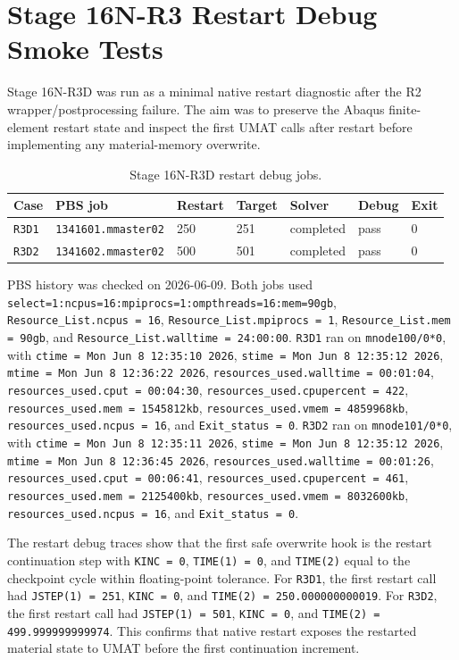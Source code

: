 \documentclass[11pt,a4paper]{article}
\newcommand{\code}[1]{\texttt{#1}}
\begin{document}
\section{Stage 16N-R3 Restart Debug Smoke Tests}

Stage 16N-R3D was run as a minimal native restart diagnostic after the R2 wrapper/postprocessing failure. The aim was to preserve the Abaqus finite-element restart state and inspect the first UMAT calls after restart before implementing any material-memory overwrite.

\begin{table}[H]
\centering
\caption{Stage 16N-R3D restart debug jobs.}
\begin{tabular}{lllllll}
\toprule
Case & PBS job & Restart & Target & Solver & Debug & Exit \\
\midrule
\code{R3D1} & \code{1341601.mmaster02} & 250 & 251 & completed & pass & 0 \\
\code{R3D2} & \code{1341602.mmaster02} & 500 & 501 & completed & pass & 0 \\
\bottomrule
\end{tabular}
\end{table}

PBS history was checked on 2026-06-09. Both jobs used \code{select=1:ncpus=16:mpiprocs=1:ompthreads=16:mem=90gb}, \code{Resource\_List.ncpus = 16}, \code{Resource\_List.mpiprocs = 1}, \code{Resource\_List.mem = 90gb}, and \code{Resource\_List.walltime = 24:00:00}. \code{R3D1} ran on \code{mnode100/0*0}, with \code{ctime = Mon Jun 8 12:35:10 2026}, \code{stime = Mon Jun 8 12:35:12 2026}, \code{mtime = Mon Jun 8 12:36:22 2026}, \code{resources\_used.walltime = 00:01:04}, \code{resources\_used.cput = 00:04:30}, \code{resources\_used.cpupercent = 422}, \code{resources\_used.mem = 1545812kb}, \code{resources\_used.vmem = 4859968kb}, \code{resources\_used.ncpus = 16}, and \code{Exit\_status = 0}. \code{R3D2} ran on \code{mnode101/0*0}, with \code{ctime = Mon Jun 8 12:35:11 2026}, \code{stime = Mon Jun 8 12:35:12 2026}, \code{mtime = Mon Jun 8 12:36:45 2026}, \code{resources\_used.walltime = 00:01:26}, \code{resources\_used.cput = 00:06:41}, \code{resources\_used.cpupercent = 461}, \code{resources\_used.mem = 2125400kb}, \code{resources\_used.vmem = 8032600kb}, \code{resources\_used.ncpus = 16}, and \code{Exit\_status = 0}.

The restart debug traces show that the first safe overwrite hook is the restart continuation step with \code{KINC = 0}, \code{TIME(1) = 0}, and \code{TIME(2)} equal to the checkpoint cycle within floating-point tolerance. For \code{R3D1}, the first restart call had \code{JSTEP(1) = 251}, \code{KINC = 0}, and \code{TIME(2) = 250.000000000019}. For \code{R3D2}, the first restart call had \code{JSTEP(1) = 501}, \code{KINC = 0}, and \code{TIME(2) = 499.999999999974}. This confirms that native restart exposes the restarted material state to UMAT before the first continuation increment.
\end{document}
